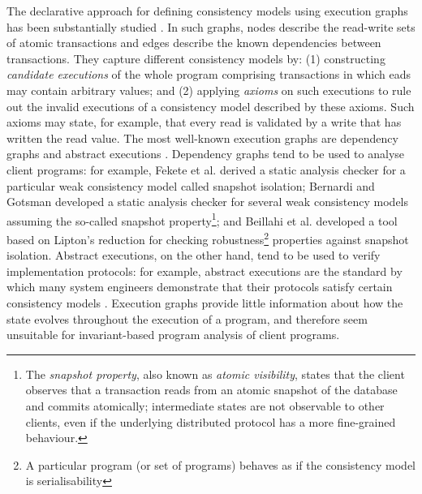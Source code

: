 The declarative approach for defining 
consistency models using execution graphs has been substantially
studied \cite{adya,ev_transactions,framework-concur,SIanalysis,laws}. 
In such graphs, nodes describe the read-write sets of  atomic transactions and edges describe the
known dependencies between transactions.
They capture different consistency models by:
(1) constructing  \emph{candidate executions} of the whole program comprising
transactions in which eads may contain arbitrary values; and 
(2) applying  \emph{axioms}  on such executions to rule out the invalid executions of 
a consistency model described by these axioms. 
Such axioms may state, for example, that every read is
validated by a write that has written the read value. 
The most well-known execution graphs are dependency graphs \cite{adya} and abstract
executions \cite{ev_transactions,framework-concur}. 
Dependency graphs tend to be used to analyse  client programs: for
example, 
Fekete et al. \citet{fekete-tods} derived 
a static analysis checker for a particular weak consistency model called
snapshot isolation;  Bernardi and Gotsman \citet{giovanni_concur16}
developed a static analysis checker for several weak consistency
models assuming the so-called snapshot property\footnote{The \emph{snapshot property}, 
also known as \emph{atomic visibility}, states that
the client observes that a transaction reads from an atomic snapshot
of the database and commits atomically;  intermediate states are not observable to other clients, 
even if the underlying distributed protocol has a more fine-grained behaviour.}; and 
Beillahi et al. \citep{snapshot-isolation-robust-tool} developed a tool based on Lipton's reduction \cite{Lipton-reduction}
for checking robustness\footnote{A particular program (or set of programs) behaves as if the consistency model is serialisability} properties against snapshot isolation.
Abstract executions, on the other hand, tend to be used to verify  implementation protocols: for example,
abstract executions are the  standard by which many system engineers
demonstrate that their protocols satisfy  certain
consistency models \cite{cops,NMSI,PSI}. 
Execution graphs provide little information about how the 
state evolves throughout the execution of a program, and 
therefore seem  unsuitable for invariant-based program analysis 
of client programs. 


